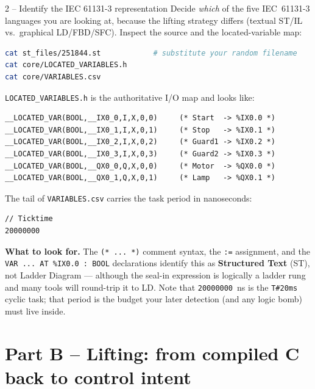 \documentclass[11pt,a4paper]{article}
\begin{document}
\begin{stepbox}{2 -- Identify the IEC 61131-3 representation}
Decide \emph{which} of the five IEC~61131-3 languages you are looking at,
because the lifting strategy differs (textual ST/IL vs.\ graphical
LD/FBD/SFC). Inspect the source and the located-variable map:
\begin{lstlisting}[language=bash]
cat st_files/251844.st            # substitute your random filename
cat core/LOCATED_VARIABLES.h
cat core/VARIABLES.csv
\end{lstlisting}
\texttt{LOCATED\_VARIABLES.h} is the authoritative I/O map and looks like:
\begin{lstlisting}
__LOCATED_VAR(BOOL,__IX0_0,I,X,0,0)     (* Start  -> %IX0.0 *)
__LOCATED_VAR(BOOL,__IX0_1,I,X,0,1)     (* Stop   -> %IX0.1 *)
__LOCATED_VAR(BOOL,__IX0_2,I,X,0,2)     (* Guard1 -> %IX0.2 *)
__LOCATED_VAR(BOOL,__IX0_3,I,X,0,3)     (* Guard2 -> %IX0.3 *)
__LOCATED_VAR(BOOL,__QX0_0,Q,X,0,0)     (* Motor  -> %QX0.0 *)
__LOCATED_VAR(BOOL,__QX0_1,Q,X,0,1)     (* Lamp   -> %QX0.1 *)
\end{lstlisting}
The tail of \texttt{VARIABLES.csv} carries the task period in nanoseconds:
\begin{lstlisting}
// Ticktime
20000000
\end{lstlisting}

\noindent\textbf{What to look for.} The \texttt{(* ... *)} comment syntax,
the \texttt{:=} assignment, and the \texttt{VAR ... AT \%IX0.0 : BOOL}
declarations identify this as \textbf{Structured Text} (ST), not Ladder
Diagram --- although the seal-in expression is logically a ladder rung and
many tools will round-trip it to LD. Note that \texttt{20000000}~ns is the
\texttt{T\#20ms} cyclic task; that period is the budget your later
detection (and any logic bomb) must live inside.
\end{stepbox}

\section*{Part B -- Lifting: from compiled C back to control intent}
\end{document}
